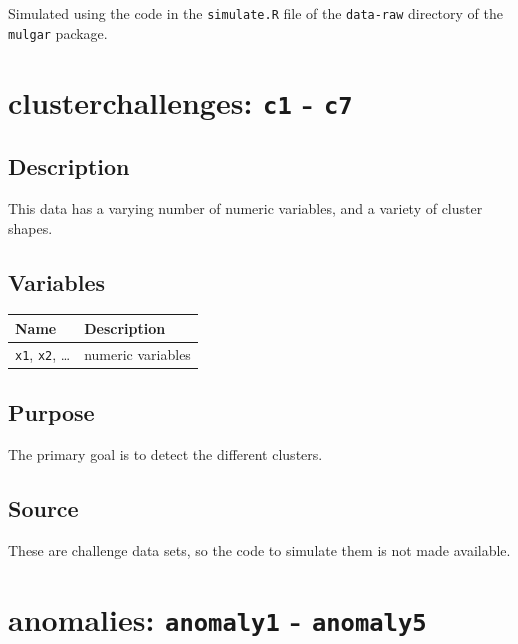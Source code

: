 \documentclass[
  letterpaper,
]{krantz}
\begin{document}
Simulated using the code in the \texttt{simulate.R} file of the
\texttt{data-raw} directory of the \texttt{mulgar} package.

\section{\texorpdfstring{clusterchallenges: \texttt{c1} -
\texttt{c7}}{clusterchallenges: c1 - c7}}\label{clusterchallenges-c1---c7}

\subsection*{Description}\label{description-9}

This data has a varying number of numeric variables, and a variety of
cluster shapes.

\subsection*{Variables}\label{variables-9}

\begin{longtable}[]{@{}ll@{}}
\toprule\noalign{}
Name & Description \\
\midrule\noalign{}
\endhead
\bottomrule\noalign{}
\endlastfoot
\texttt{x1}, \texttt{x2}, \ldots{} & numeric variables \\
\end{longtable}

\subsection*{Purpose}\label{purpose-9}

The primary goal is to detect the different clusters.

\subsection*{Source}\label{source-9}

These are challenge data sets, so the code to simulate them is not made
available.

\section{\texorpdfstring{anomalies: \texttt{anomaly1} -
\texttt{anomaly5}}{anomalies: anomaly1 - anomaly5}}\label{anomalies-anomaly1---anomaly5}
\end{document}
